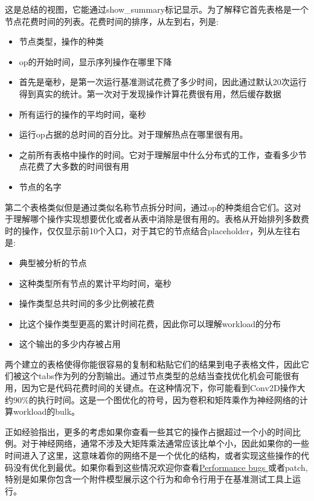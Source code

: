 这是总结的视图，它能通过show\_summary标记显示。为了解释它首先表格是一个节点花费时间的列表。花费时间的排序，从左到右，列是:
\begin{itemize}
\item 节点类型，操作的种类
\item op的开始时间，显示序列操作在哪里下降
\item 首先是毫秒，是第一次运行基准测试花费了多少时间，因此通过默认20次运行得到真实的统计。第一次对于发现操作计算花费很有用，然后缓存数据
\item 所有运行的操作的平均时间，毫秒
\item 运行op占据的总时间的百分比。对于理解热点在哪里很有用。
\item 之前所有表格中操作的时间。它对于理解层中什么分布式的工作，查看多少节点花费了大多数的时间很有用
\item 节点的名字
\end{itemize}
第二个表格类似但是通过类似名称节点拆分时间，通过op的种类组合它们。这对于理解哪个操作实现想要优化或者从表中消除是很有用的。表格从开始排列多数费时的操作，仅仅显示前10个入口，对于其它的节点结合placeholder，列从左往右是:
\begin{itemize}
\item 典型被分析的节点
\item 这种类型所有节点的累计平均时间，毫秒
\item 操作类型总共时间的多少比例被花费
\item 比这个操作类型更高的累计时间花费，因此你可以理解workload的分布
\item 这个输出的多少内存被占用
\end{itemize}
两个建立的表格使得你能很容易的复制和粘贴它们的结果到电子表格文件，因此它们被这个tabs作为列的分割输出。通过节点类型的总结当查找优化机会可能很有用，因为它是代码花费时间的关键点。在这种情况下，你可能看到Conv2D操作大约90\%的执行时间。这是一个图优化的符号，因为卷积和矩阵乘作为神经网络的计算workload的bulk。

正如经验指出，更多的考虑如果你查看一些其它的操作占据超过一个小的时间比例。对于神经网络，通常不涉及大矩阵乘法通常应该比单个小，因此如果你的一些时间进入了这里，这意味着你的网络不是一个优化的结构，或者实现这些操作的代码没有优化到最优。如果你看到这些情况欢迎你查看\href{https://github.com/tensorflow/tensorflow/issues}{Performance bugs }或者patch,特别是如果你包含一个附件模型展示这个行为和命令行用于在基准测试工具上运行。

